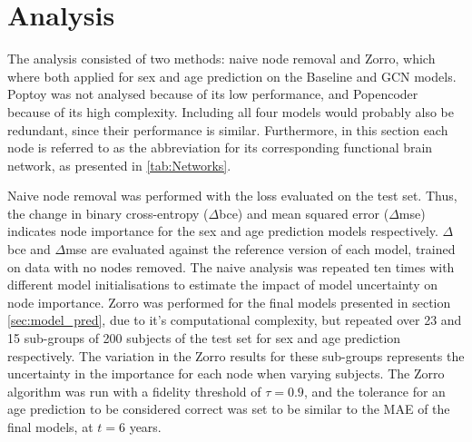 \section{Analysis}
The analysis consisted of two methods: naive node removal and Zorro, which where both applied for sex and age prediction on the Baseline and GCN models. Poptoy was not analysed because of its low performance, and Popencoder because of its high complexity. Including all four models would probably also be redundant, since their performance is similar. Furthermore, in this section each node is referred to as the abbreviation for its corresponding functional brain network, as presented in \cref{tab:Networks}.

Naive node removal was performed with the loss evaluated on the test set. Thus, the change in binary cross-entropy ($\Delta$\acrshort{bce}) and mean squared error ($\Delta$\acrshort{mse}) indicates node importance for the sex and age prediction models respectively. $\Delta$\acrshort{bce} and $\Delta$\acrshort{mse} are evaluated against the reference version of each model, trained on data with no nodes removed. The naive analysis was repeated ten times with different model initialisations to estimate the impact of model uncertainty on node importance. Zorro was performed for the final models presented in section \ref{sec:model_pred}, due to it's computational complexity, but repeated over 23 and 15 sub-groups of 200 subjects of the test set for sex and age prediction respectively. The variation in the Zorro results for these sub-groups represents the uncertainty in the importance for each node when varying subjects. The Zorro algorithm was run with a fidelity threshold of $\tau=0.9$, and the tolerance for an age prediction to be considered correct was set to be similar to the MAE of the final models, at $t=6$ years. 

